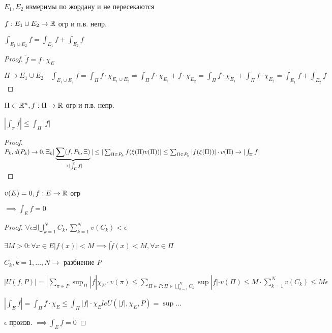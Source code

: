     \begin{lemma}
        $E_1, E_2$ измеримы по жордану и не пересекаются

        $f: E_1 \cup E_2 \to \mathbb{R}$ огр и п.в. непр.

        $\int_{E_1 \cup E_2} f = \int_{E_1} f + \int_{E_2} f$
    \end{lemma}
    \begin{proof}
        $\widetilde{f} = f \cdot \chi_E$ 

        $\Pi \supset E_1 \cup E_2 \quad \int_{E_1 \cup E_2} f = \int_\Pi f \cdot \chi_{E_1 \cup E_2} = 
        \int_\Pi f \cdot \chi_{E_1} + f \cdot \chi_{E_2} = \int_\Pi f \cdot \chi_{E_1} + \int_\Pi f \cdot \chi_{E_2} =
        \int_{E_1} f + \int_{E_2} f
        $
    \end{proof}

    \begin{lemma}
        $\Pi \subset \mathbb{R}^n, f: \Pi \to \mathbb{R}$ огр и п.в. непр.

        $|\int_\pi f | \le \int_\Pi | f |$
    \end{lemma}
    \begin{proof}
        $P_k, d(P_k) \to 0, \Xi_k \\
        |\underbrace{\sum(f, P_k, \Xi)}_{\to |\int_\Pi f|}| \le  |\sum_{\Pi \in P_k} f(\xi(\Pi) v(\Pi)) |
         \le \sum_{\Pi \in P_k} | f(\xi(\Pi)) | \cdot v(\Pi) \to |\int_\Pi f|
        $
    \end{proof}
    \begin{lemma}
        $v(E) = 0, f: E \to \mathbb{R}$ огр 

        $\implies \int_E f  = 0$
    \end{lemma}
    \begin{proof}
        $\forall \epsilon \exists \bigcup^N_{k=1}C_k, \sum^N_{k=1}v(C_k) < \epsilon$

        $\exists M > 0: \forall x \in E |f(x)| < M \implies | \widetilde{f}(x) < M, \forall x \in \Pi$

        $C_k, k=1, \dotsc, N \to$  разбиение $P$

        $| U(f, P) | = | \sum_{\pi \in P} \sup_\Pi |f|\chi_E \cdot v(\pi) \le 
        \sum_{\Pi \in P: \Pi \in \bigcup^N_{k=1} C_k} \sup |f|\cdot v(\Pi) \le
        M \cdot \sum^N_{k=1}v(C_k) \le M\epsilon$

        $|\int_E f| = \int_\Pi f\cdot\chi_E \le \int_\Pi |f|\cdot \chi_E 
        le U(|f|, \chi_E, P) = \sup ... $

        $\epsilon$ произв. $\implies \int_E f = 0$
        
    \end{proof}

